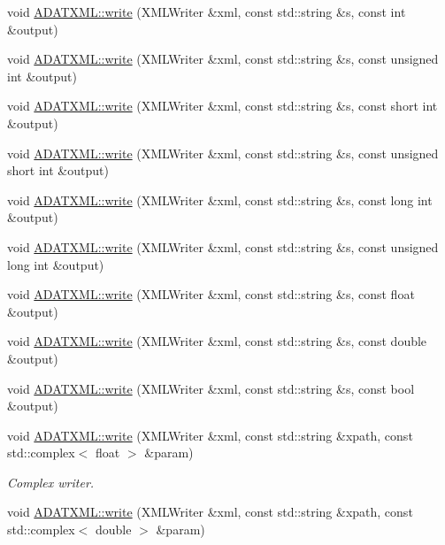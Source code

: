 \begin{DoxyCompactItemize}
\item 
void \mbox{\hyperlink{group__io_gadc4b57f737a20fc500619ce19834df8e}{A\+D\+A\+T\+X\+M\+L\+::write}} (X\+M\+L\+Writer \&xml, const std\+::string \&s, const int \&output)
\item 
void \mbox{\hyperlink{group__io_ga5856cc9bbcc04728d4c4c248085478d6}{A\+D\+A\+T\+X\+M\+L\+::write}} (X\+M\+L\+Writer \&xml, const std\+::string \&s, const unsigned int \&output)
\item 
void \mbox{\hyperlink{group__io_ga0576b7ad74a4cc939c5fd164dddd2ac9}{A\+D\+A\+T\+X\+M\+L\+::write}} (X\+M\+L\+Writer \&xml, const std\+::string \&s, const short int \&output)
\item 
void \mbox{\hyperlink{group__io_gabe7167254a6bfbd7e4d5046e1758e48f}{A\+D\+A\+T\+X\+M\+L\+::write}} (X\+M\+L\+Writer \&xml, const std\+::string \&s, const unsigned short int \&output)
\item 
void \mbox{\hyperlink{group__io_gae6391d5ecac6e646e20a7cc2dd67ffbd}{A\+D\+A\+T\+X\+M\+L\+::write}} (X\+M\+L\+Writer \&xml, const std\+::string \&s, const long int \&output)
\item 
void \mbox{\hyperlink{group__io_gaca56f1bd58c3916a9c9ca8f0041b9c21}{A\+D\+A\+T\+X\+M\+L\+::write}} (X\+M\+L\+Writer \&xml, const std\+::string \&s, const unsigned long int \&output)
\item 
void \mbox{\hyperlink{group__io_ga004a6551422be9e3a46d53e5e974acfd}{A\+D\+A\+T\+X\+M\+L\+::write}} (X\+M\+L\+Writer \&xml, const std\+::string \&s, const float \&output)
\item 
void \mbox{\hyperlink{group__io_gae1439bc15e3d4497d18ecc77d6443d3b}{A\+D\+A\+T\+X\+M\+L\+::write}} (X\+M\+L\+Writer \&xml, const std\+::string \&s, const double \&output)
\item 
void \mbox{\hyperlink{group__io_gaa6f01baa873f2c676d573b16ff3a1099}{A\+D\+A\+T\+X\+M\+L\+::write}} (X\+M\+L\+Writer \&xml, const std\+::string \&s, const bool \&output)
\item 
void \mbox{\hyperlink{group__io_ga120f4c9a4f62f8190c2d87d73124fded}{A\+D\+A\+T\+X\+M\+L\+::write}} (X\+M\+L\+Writer \&xml, const std\+::string \&xpath, const std\+::complex$<$ float $>$ \&param)
\begin{DoxyCompactList}\small\item\em Complex writer. \end{DoxyCompactList}\item 
void \mbox{\hyperlink{group__io_ga841e4774bcd8f9d6b7d0d8f0ae20d34f}{A\+D\+A\+T\+X\+M\+L\+::write}} (X\+M\+L\+Writer \&xml, const std\+::string \&xpath, const std\+::complex$<$ double $>$ \&param)

\end{DoxyCompactItemize}
